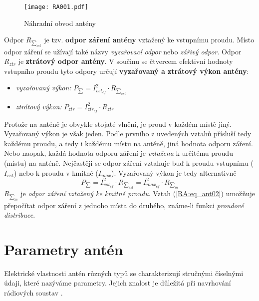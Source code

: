       \begin{figure}[ht!]   %
        \centering
        \texttt{[image: RA001.pdf]}
        \caption{Náhradní obvod antény}
        \label{RA:fig_001}
      \end{figure}
      
      Odpor \(R_{\sum_{vst}}\) je tzv. \textbf{odpor záření antény} vztažený ke vstupnímu proudu. 
      Místo odpor záření se užívají také názvy \emph{vyzařovací odpor} nebo \emph{zářivý odpor}. 
      Odpor  \(R_{ztr}\) je \textbf{ztrátový odpor antény}. V součinu se čtvercem efektivní hodnoty 
      vstupního proudu tyto odpory určují \textbf{vyzařovaný a ztrátový výkon antény}:
      \begin{itemize}\addtolength{\itemsep}{-0.5\baselineskip}
        \item \emph{vyzařovaný výkon:} \(P_{\sum} = I^2_{vst_{ef}}\cdot R_{\sum_{vst}}\)
        \item \emph{ztrátový výkon:}   \(P_{ztr} = I^2_{ztr_{ef}}\cdot R_{ztr}\)
      \end{itemize}
      Protože na anténě je obvykle stojaté vlnění, je proud v každém místě jiný. Vyzařovaný výkon 
      je však jeden. Podle prvního z uvedených vztahů přísluší tedy každému proudu, a tedy i 
      každému místu na anténě, jiná hodnota odporu záření. Nebo naopak, každá hodnota odporu záření 
      je \emph{vztažena} k určitému proudu (místu) na anténě. Nejčastěji se odpor záření vztahuje 
      buď k proudu vstupnímu (\(I_{vst}\)) nebo k proudu v kmitně (\(I_{max}\)). Vyzařovaný výkon 
      je tedy alternativně
      \begin{equation}\label{RA:eq_ant02}
        P_{\sum} = I^2_{vst_{ef}}\cdot R_{\sum_{vst}} = I^2_{max_{ef}}\cdot R_{\sum_{m}}
      \end{equation} 
      \(R_{\sum_{m}}\) je \emph{odpor záření vztažený ke kmitně proudu}. Vztah (\ref{RA:eq_ant02}) 
      umožňuje přepočítat odpor záření z jednoho místa do druhého, známe-li funkci \emph{proudové 
      distribuce}. 
      
      
     
  \section{Parametry antén}
    Elektrické vlastnosti antén různých typů se charakterizují stručnými číselnými údaji, které 
    nazýváme parametry. Jejich znalost je důležitá při navrhování rádiových soustav 
    \cite[s.~46]{Hanus2002}. 

